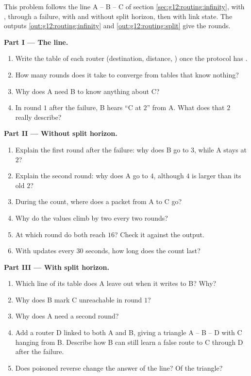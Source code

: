 \begin{problem}\label{pb:g12:routing:1}
This problem follows the line A -- B -- C of section \ref{sec:g12:routing:infinity}, with , through a
failure, with and without split horizon, then with link state. The outputs
\ref{out:g12:routing:infinity} and \ref{out:g12:routing:split} give the rounds.

\medskip\noindent\textbf{Part I --- The line.}
\begin{enumerate}
  \item Write the table of each router (destination, distance, ) once the protocol has .
  \item How many rounds does it take to converge from tables that know nothing?
  \item Why does A need B to know anything about C?
  \item In round $1$ after the failure, B hears ``C at $2$'' from A. What does that $2$ really describe?
\end{enumerate}

\medskip\noindent\textbf{Part II --- Without split horizon.}
\begin{enumerate}[resume]
  \item Explain the first round after the failure: why does B go to $3$, while A stays at $2$?
  \item Explain the second round: why does A go to $4$, although $4$ is larger than its old $2$?
  \item During the count, where does a packet from A to C go?
  \item Why do the values climb by two every two rounds?
  \item At which round do both reach $16$? Check it against the output.
  \item With updates every $30$ seconds, how long does the count last?
\end{enumerate}

\medskip\noindent\textbf{Part III --- With split horizon.}
\begin{enumerate}[resume]
  \item Which line of its table does A leave out when it writes to B? Why?
  \item Why does B mark C unreachable in round $1$?
  \item Why does A need a second round?
  \item Add a router D linked to both A and B, giving a triangle A -- B -- D with C hanging from B. Describe how B
    can still learn a false route to C through D after the failure.
  \item Does poisoned reverse change the answer of the line? Of the triangle?
\end{enumerate}


\end{problem}
